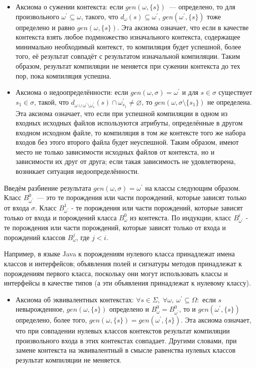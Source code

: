 \begin{itemize}
	\item Аксиома о сужении контекста: если $gen(\omega,\{s\})$~--- определено, то для произвольного $\omega^\prime\subseteq\omega$, такого, что $d_\omega(s)\subseteq\omega^\prime$, $gen(\omega^\prime, \{s\})$ тоже определено и равно $gen(\omega,\{s\})$. Эта аксиома означает, что если в качестве контекста взять любое подмножество изначального контекста, содержащее минимально необходимый контекст, то компиляция будет успешной, более того, её результат совпадёт с результатом изначальной компиляции. Таким образом, результат компиляции не меняется при сужении контекста до тех пор, пока компиляция успешна.
	
	\item Аксиома о недоопределённости: если $gen(\omega, \sigma) = \omega^\prime$ и для $s \in \sigma$ существует $s_1 \in \sigma$, такой, что $d_{\omega \cup \omega^\prime \setminus \omega^\prime_s}(s) \cap \omega^\prime_{s_1} \neq \varnothing$, то $gen(\omega, \sigma \setminus \{s_1\})$ не определена. Эта аксиома означает, что если при успешной компиляции в одном из входных исходных файлов используются атрибуты, определённые в другом входном исходном файле, то компиляция в том же контексте того же набора входов без этого второго файла будет неуспешной. Таким образом, имеют место не только зависимости исходных файлов от контекста, но и зависимости их друг от друга; если такая зависимость не удовлетворена, возникает ситуация недоопределённости.
\end{itemize}

Введём разбиение результата $gen(\omega, \sigma) = \omega^\prime$ на классы следующим образом. Класс $B^0_{\omega^\prime}$~--- это те порождения или части порождений, которые зависят только от входа $\sigma$. Класс $B^1_{\omega^\prime}$ - те порождения или части порождений, которые зависят только от входа и порождений класса $B^0_{\omega}$ из контекста. По индукции, класс $B^i_{\omega^\prime}$ - те порождения или части порождений, которые зависят только от входа и порождений классов $B^j_{\omega}$, где $j < i$.

Например, в языке Java к порождениям нулевого класса принадлежат имена классов и интерфейсов; объявления полей и сигнатуры методов принадлежат к порождениям первого класса, поскольку они могут использовать классы и интерфейсы в качестве типов (а эти объявления принадлежат к нулевому классу).

\begin{itemize}
	\item Аксиома об эквивалентных контекстах: $\forall s \in \Sigma,\; \forall \omega,\: \omega^\prime \subseteq \Omega:$ если $s$ невырожденное, $gen(\omega, \{s\})$ определено и $B^0_{\omega} = B^0_{\omega^\prime}$, то и $gen(\omega^\prime, \{s\})$ определено, более того, $gen(\omega, \{s\}) = gen(\omega^\prime, \{s\})$. Эта аксиома означает, что при совпадении нулевых классов контекстов результат компиляции произвольного входа в этих контекстах совпадает. Другими словами, при замене контекста на эквивалентный в смысле равенства нулевых классов результат компиляции не меняется.
\end{itemize}

